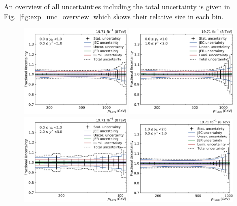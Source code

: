 An overview of all uncertainties including the total uncertainty is given in
Fig.~\ref{fig:exp_unc_overview} which shows their relative size in each bin.

\begin{figure}[htbp]
    \centering
    \includegraphics[width=0.49\textwidth]{figures/measurement/exp_unc_overview_yb0ys0.pdf}\hfill
    \includegraphics[width=0.49\textwidth]{figures/measurement/exp_unc_overview_yb0ys1.pdf}
    \includegraphics[width=0.49\textwidth]{figures/measurement/exp_unc_overview_yb0ys2.pdf}\hfill
    \includegraphics[width=0.49\textwidth]{figures/measurement/exp_unc_overview_yb1ys0.pdf}

\end{figure}
